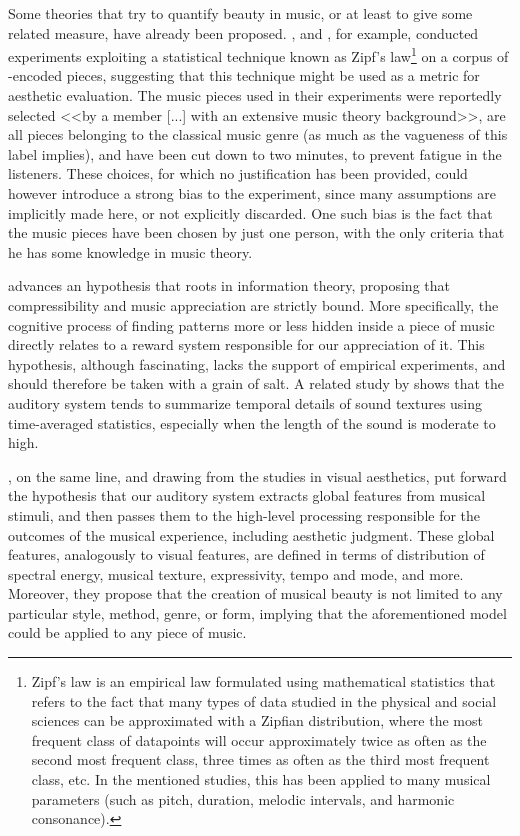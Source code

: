 Some theories that try to quantify beauty in music, or at least to give some related measure, have already been proposed. \cite{manaris2002progress}, and \cite{manaris2005zipf}, for example, conducted experiments exploiting a statistical technique known as Zipf’s law\footnote{Zipf's law is an empirical law formulated using mathematical statistics that refers to the fact that many types of data studied in the physical and social sciences can be approximated with a Zipfian distribution, where the most frequent class of datapoints will occur approximately twice as often as the second most frequent class, three times as often as the third most frequent class, etc. In the mentioned studies, this has been applied to many musical parameters (such as pitch, duration, melodic intervals, and harmonic consonance).} on a corpus of -encoded pieces, suggesting that this technique might be used as a metric for aesthetic evaluation. The music pieces used in their experiments were reportedly selected <<by a member [...] with an extensive music theory background>>, are all pieces belonging to the classical music genre (as much as the vagueness of this label implies), and have been cut down to two minutes, to prevent fatigue in the listeners. These choices, for which no justification has been provided, could however introduce a strong bias to the experiment, since many assumptions are implicitly made here, or not explicitly discarded. One such bias is the fact that the music pieces have been chosen by just one person, with the only criteria that he has some knowledge in music theory.

\cite{hudson2011musical} advances an hypothesis that roots in information theory, proposing that compressibility and music appreciation are strictly bound. More specifically, the cognitive process of finding patterns more or less hidden inside a piece of music directly relates to a reward system responsible for our appreciation of it. This hypothesis, although fascinating, lacks the support of empirical experiments, and should therefore be taken with a grain of salt. A related study by \cite{mcdermott2013summary} shows that the auditory system tends to summarize temporal details of sound textures using time-averaged statistics, especially when the length of the sound is moderate to high.

\cite{brattico2017global}, on the same line, and drawing from the studies in visual aesthetics, put forward the hypothesis that our auditory system extracts global features from musical stimuli, and then passes them to the high-level processing responsible for the outcomes of the musical experience, including aesthetic judgment. These global features, analogously to visual features, are defined in terms of distribution of spectral energy, musical texture, expressivity, tempo and mode, and more. Moreover, they propose that the creation of musical beauty is not limited to any particular style, method, genre, or form, implying that the aforementioned model could be applied to any piece of music.

